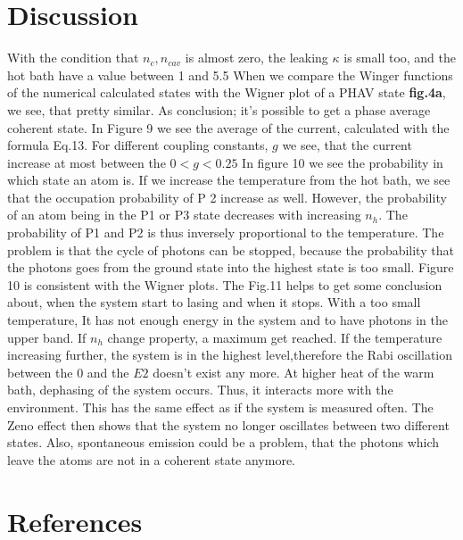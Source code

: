 \documentclass[12pt,a4paper]{article}
\begin{document}
\section{Discussion}
With the condition that $n_c, n_{cav}$ is almost zero, the leaking $\kappa$ is small too, and the hot bath have a value between 1 and 5.5 When we compare the Winger functions of the numerical calculated states with the Wigner plot of a PHAV state \textbf{fig.4a}, we see, that pretty similar. As conclusion; it's possible to get a phase average coherent state. 
In Figure 9 we see the average of the current, calculated with the formula Eq.13.  For different coupling constants, $g$
we see, that the current increase at most between the $ 0<g<0.25$ 
In figure 10 we see the probability in which state an atom is. If we increase the temperature from the hot bath, we see that the occupation probability of P 2 increase as well. However, the probability of an atom being in the P1 or P3 state decreases with increasing $n_h$. The probability of P1 and P2 is thus inversely proportional to the temperature.
The problem is that the cycle of photons can be stopped, because the probability that the photons goes from the ground state into the highest state is too small.
Figure 10 is consistent with the Wigner plots.
The Fig.11 helps to get some conclusion about, when the system start to lasing and when it stops. With a too small temperature, It has not enough energy in the system and to have photons in the upper band. If $n_h$ change property, a maximum get reached. If the temperature increasing further, the system is in the highest level,therefore the Rabi oscillation between the 0 and the $E2$ doesn't exist any more.
At higher heat of the warm bath, dephasing of the system occurs. Thus, it interacts more with the environment. This has the same effect as if the system is measured often. The Zeno effect then shows that the system no longer oscillates between two different states. Also, spontaneous  emission could be a problem, that the photons which leave the atoms are not in a coherent state anymore. \cite{Niedenzu2019}
\cite{Scovil1959}
\section{References}
\printbibliography[title={Whole bibliography}]



\newpage
\end{document}
